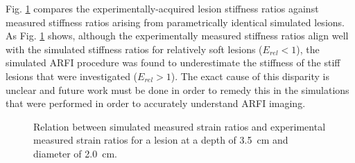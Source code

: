 			Fig. \ref{fig:arfi_phantom_validation} compares the experimentally-acquired lesion stiffness ratios against measured stiffness ratios arising from parametrically identical simulated lesions. As Fig. \ref{fig:arfi_phantom_validation} shows, although the experimentally measured stiffness ratios align well with the simulated stiffness ratios for relatively soft lesions ($E_{rel} < 1$), the simulated ARFI procedure was found to underestimate the stiffness of the stiff lesions that were investigated ($E_{rel} > 1$). The exact cause of this disparity is unclear and future work must be done in order to remedy this in the simulations that were performed in order to accurately understand ARFI imaging.

			\begin{figure}[!htb]
				\centering
				\caption[Experimental validation of ARFI imaging model results]{Relation between simulated measured strain ratios and experimental measured strain ratios for a lesion at a depth of \SI{3.5}{\cm} and diameter of \SI{2.0}{\cm}.}
				\label{fig:arfi_phantom_validation}
			\end{figure}

